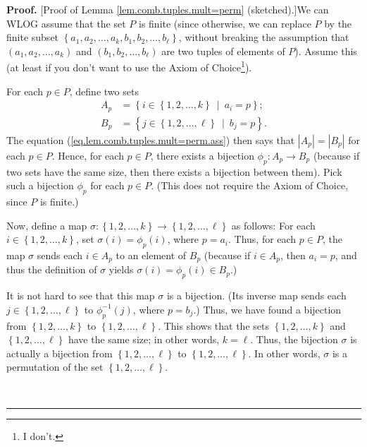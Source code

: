 \documentclass[numbers=enddot,12pt,final,onecolumn,notitlepage]{scrartcl}%
\numberwithin{exer}{subsection}
\theoremstyle{definition}
\newenvironment{fineprint}{\begin{small}}{\end{small}}
\newenvironment{proof}[1][Proof]{\noindent\textbf{#1.} }{\ \rule{0.5em}{0.5em}}
\begin{document}
\begin{fineprint}
\begin{proof}
[Proof of Lemma \ref{lem.comb.tuples.mult=perm} (sketched).]We can WLOG assume
that the set $P$ is finite (since otherwise, we can replace $P$ by the finite
subset $\left\{  a_{1},a_{2},\ldots,a_{k},b_{1},b_{2},\ldots,b_{\ell}\right\}
$, without breaking the assumption that $\left(  a_{1},a_{2},\ldots
,a_{k}\right)  $ and $\left(  b_{1},b_{2},\ldots,b_{\ell}\right)  $ are two
tuples of elements of $P$). Assume this (at least if you don't want to use the
Axiom of Choice\footnote{I don't.}).

For each $p\in P$, define two sets%
\begin{align*}
A_{p}  &  =\left\{  i\in\left\{  1,2,\ldots,k\right\}  \ \mid\ a_{i}%
=p\right\}  ;\\
B_{p}  &  =\left\{  j\in\left\{  1,2,\ldots,\ell\right\}  \ \mid
\ b_{j}=p\right\}  .
\end{align*}
The equation (\ref{eq.lem.comb.tuples.mult=perm.ass}) then says that
$\left\vert A_{p}\right\vert =\left\vert B_{p}\right\vert $ for each $p\in P$.
Hence, for each $p\in P$, there exists a bijection $\phi_{p}:A_{p}\rightarrow
B_{p}$ (because if two sets have the same size, then there exists a bijection
between them). Pick such a bijection $\phi_{p}$ for each $p\in P$. (This does
not require the Axiom of Choice, since $P$ is finite.)

Now, define a map $\sigma:\left\{  1,2,\ldots,k\right\}  \rightarrow\left\{
1,2,\ldots,\ell\right\}  $ as follows: For each $i\in\left\{  1,2,\ldots
,k\right\}  $, set $\sigma\left(  i\right)  =\phi_{p}\left(  i\right)  $,
where $p=a_{i}$. Thus, for each $p\in P$, the map $\sigma$ sends each $i\in
A_{p}$ to an element of $B_{p}$ (because if $i\in A_{p}$, then $a_{i}=p$, and
thus the definition of $\sigma$ yields $\sigma\left(  i\right)  =\phi
_{p}\left(  i\right)  \in B_{p}$.)

It is not hard to see that this map $\sigma$ is a bijection. (Its inverse map
sends each $j\in\left\{  1,2,\ldots,\ell\right\}  $ to $\phi_{p}^{-1}\left(
j\right)  $, where $p=b_{j}$.) Thus, we have found a bijection from $\left\{
1,2,\ldots,k\right\}  $ to $\left\{  1,2,\ldots,\ell\right\}  $. This shows
that the sets $\left\{  1,2,\ldots,k\right\}  $ and $\left\{  1,2,\ldots
,\ell\right\}  $ have the same size; in other words, $k=\ell$. Thus, the
bijection $\sigma$ is actually a bijection from $\left\{  1,2,\ldots
,\ell\right\}  $ to $\left\{  1,2,\ldots,\ell\right\}  $. In other words,
$\sigma$ is a permutation of the set $\left\{  1,2,\ldots,\ell\right\}  $.


\end{proof}
\end{fineprint}
\end{document}
